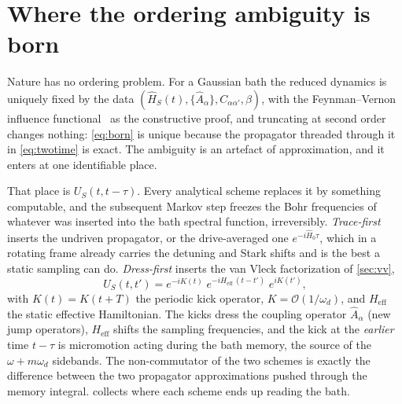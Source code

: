 \documentclass[a4paper,11pt]{article}
\newcommand{\eff}{\mathrm{eff}}
\begin{document}
\section{Where the ordering ambiguity is born}\label{sec:origin}

Nature has no ordering problem. For a Gaussian bath the reduced dynamics is uniquely fixed by the data $(\hat H_S(t), \{\hat A_\alpha\}, C_{\alpha\alpha'}, \beta)$, with the Feynman--Vernon influence functional~\cite{FeynmanVernon1963} as the constructive proof, and truncating at second order changes nothing: \cref{eq:born} is unique because the propagator threaded through it in \cref{eq:twotime} is exact. The ambiguity is an artefact of approximation, and it enters at one identifiable place.

That place is $U_S(t,t-\tau)$. Every analytical scheme replaces it by something computable, and the subsequent Markov step freezes the Bohr frequencies of whatever was inserted into the bath spectral function, irreversibly. \emph{Trace-first} inserts the undriven propagator, or the drive-averaged one $e^{-i\hat H_0\tau}$, which in a rotating frame already carries the detuning and Stark shifts and is the best a static sampling can do. \emph{Dress-first} inserts the van Vleck factorization of \cref{sec:vv},
\begin{equation*}
  U_S(t,t') = e^{-iK(t)}\;e^{-iH_\eff\,(t-t')}\;e^{iK(t')},
\end{equation*}
with $K(t)=K(t+T)$ the periodic kick operator, $K = \mathcal O(1/\omega_d)$, and $H_\eff$ the static effective Hamiltonian. The kicks dress the coupling operator $\hat A_\alpha$ (new jump operators), $H_\eff$ shifts the sampling frequencies, and the kick at the \emph{earlier} time $t-\tau$ is micromotion acting during the bath memory, the source of the $\omega + m\omega_d$ sidebands. The non-commutator of the two schemes is exactly the difference between the two propagator approximations pushed through the memory integral.  collects where each scheme ends up reading the bath.
\end{document}
